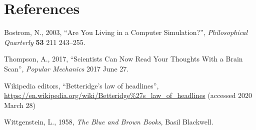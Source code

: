 \documentclass[12pt,letterpaper]{article}
\begin{document}
\section*{References}
\begin{trivlist}
\item Bostrom, N., 2003, ``Are You Living in a Computer Simulation?'',
  \textit{Philosophical Quarterly} \textbf{53} 211 243--255.
\item Thompson, A., 2017, ``Scientists Can Now Read Your Thoughts With a Brain Scan'',
  \textit{Popular Mechanics} 2017 June 27.
\item Wikipedia editors, ``Betteridge's law of headlines'',
  \url{https://en.wikipedia.org/wiki/Betteridge%27s_law_of_headlines}
    (accessed 2020 March 28)
\item Wittgenstein, L., 1958, \textit{The Blue and Brown Books},
  Basil Blackwell.
\end{trivlist}
\end{document}
